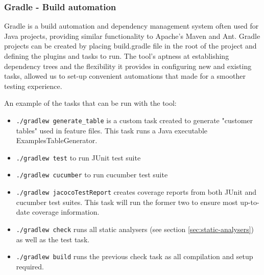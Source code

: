 \subsubsection{Gradle - Build automation}
Gradle is a build automation and dependency management system often used for Java projects, providing similar functionality to Apache’s Maven and Ant. 
Gradle projects can be created by placing build.gradle file in the root of the project and defining the plugins and tasks to run. 
The tool's aptness at establishing dependency trees and the flexibility it provides in configuring new and existing tasks, allowed us to set-up convenient automations that made for a smoother testing experience. 
\par
An example of the tasks that can be run with the tool: 
\begin{itemize}
    \item \lstinline{./gradlew generate_table} is a custom task created to generate "customer tables" used in feature files. This task runs a Java executable ExamplesTableGenerator.
    \item \lstinline{./gradlew test} to run JUnit test suite 
    \item \lstinline{./gradlew cucumber} to run cucumber test suite 
    \item \lstinline{./gradlew jacocoTestReport} creates coverage reports from both JUnit and cucumber test suites. This task will run the former two to ensure most up-to-date coverage information. 
    \item \lstinline{./gradlew check} runs all static analysers (see section \ref{sec:static-analysers}) as well as the test task. 
    \item \lstinline{./gradlew build} runs the previous check task as all compilation and setup required.  
\end{itemize}
